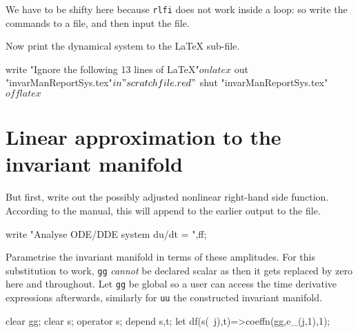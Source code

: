 \documentclass[11pt,a5paper]{article}
\begin{document}
We have to be shifty here because \verb|rlfi| does not work
inside a loop: so write the commands to a file, and then
input the file.

Now print the dynamical system to the LaTeX sub-file.
\begin{reduce}
write "Ignore the following 13 lines of LaTeX"$
on latex$
out "invarManReportSys.tex"$
in "scratchfile.red"$
shut "invarManReportSys.tex"$
off latex$
\end{reduce}







\section{Linear approximation to the invariant manifold}

But first, write out the possibly adjusted nonlinear
right-hand side function. According to the manual, this will
append to the earlier output to the file.
\begin{reduce}
write "Analyse ODE/DDE system du/dt = ",ff;
\end{reduce}

Parametrise the invariant manifold in terms of these
amplitudes. For this substitution to work, \verb|gg|
\emph{cannot} be declared scalar as then it gets replaced by
zero here and throughout.  Let \verb|gg| be global so a user
can access the time derivative expressions afterwards,
similarly for \verb|uu| the constructed invariant manifold.
\begin{reduce}
clear gg;
clear s; operator s; depend s,t;
let df(s(~j),t)=>coeffn(gg,e_(j,1),1);
\end{reduce}
\end{document}
